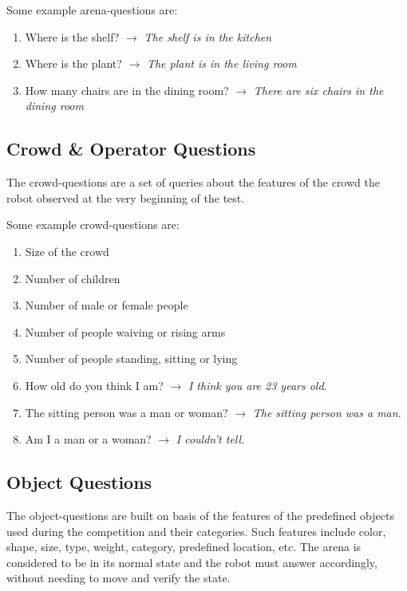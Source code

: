 Some example arena-questions are:
\begin{enumerate}
    \item Where is the shelf? $\rightarrow$ \textit{The shelf is in the kitchen}
    \item Where is the plant? $\rightarrow$ \textit{The plant is in the living room}
    \item How many chairs are in the dining room? $\rightarrow$ \textit{There are six chairs in the dining room}
\end{enumerate}

\subsection{Crowd \& Operator Questions}
The crowd-questions are a set of queries about the features of the crowd the robot observed at the very beginning of the test.

Some example crowd-questions are:
\begin{enumerate}
    \item Size of the crowd
    \item Number of children
    \item Number of male or female people
    \item Number of people waiving or rising arms
    \item Number of people standing, sitting or lying
    \item How old do you think I am? $\rightarrow$ \textit{I think you are 23 years old}.
    \item The sitting person was a man or woman? $\rightarrow$ \textit{The sitting person was a man}.
    \item Am I a man or a woman? $\rightarrow$ \textit{I couldn't tell.}
\end{enumerate}

\subsection{Object Questions}
The object-questions are built on basis of the features of the predefined objects used during the competition and their categories. Such features include color, shape, size, type, weight, category, predefined location, etc. The arena is considered to be in its normal state and the robot must answer accordingly, without needing to move and verify the state.

